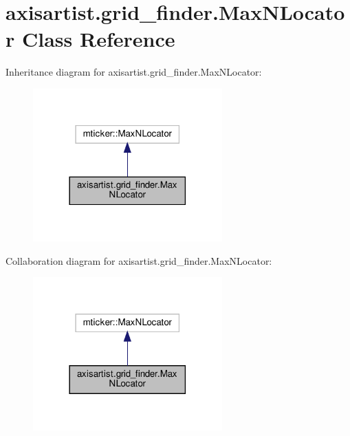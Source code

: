 \hypertarget{classaxisartist_1_1grid__finder_1_1MaxNLocator}{}\section{axisartist.\+grid\+\_\+finder.\+Max\+N\+Locator Class Reference}
\label{classaxisartist_1_1grid__finder_1_1MaxNLocator}


Inheritance diagram for axisartist.\+grid\+\_\+finder.\+Max\+N\+Locator\+:
\nopagebreak
\begin{figure}[H]
\begin{center}
\leavevmode
\includegraphics[width=206pt]{classaxisartist_1_1grid__finder_1_1MaxNLocator__inherit__graph}
\end{center}
\end{figure}


Collaboration diagram for axisartist.\+grid\+\_\+finder.\+Max\+N\+Locator\+:
\nopagebreak
\begin{figure}[H]
\begin{center}
\leavevmode
\includegraphics[width=206pt]{classaxisartist_1_1grid__finder_1_1MaxNLocator__coll__graph}
\end{center}
\end{figure}
